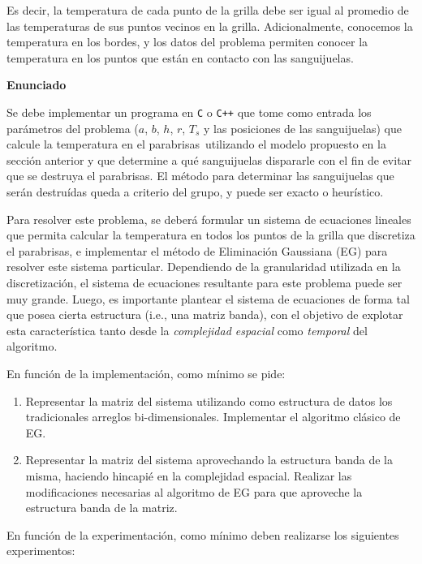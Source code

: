 \documentclass[double, 1.5in, 12pt]{beavtex}
\newcommand{\atacante}{sanguijuela}
\newcommand{\objeto}{parabrisas}
\begin{document}
Es decir, la temperatura de cada punto de la grilla debe ser igual al promedio de las tem\-pe\-ra\-tu\-ras de sus puntos vecinos en la grilla. Adicionalmente, conocemos la temperatura en los bordes, y los datos del problema permiten conocer la temperatura en los puntos que est\'an en contacto con las \atacante s.

{\noindent \bf Enunciado}

Se debe implementar un programa en \verb+C+ o \verb-C++- que tome como entrada los par\'ametros del problema ($a$, $b$, $h$, $r$, $T_s$ y las posiciones de las \atacante s) que calcule la temperatura en el \objeto\ utilizando el modelo propuesto en la secci\'on anterior y que determine a qu\'e \atacante s dispararle con el fin de evitar que se destruya el \objeto. El m\'etodo para determinar las \atacante s que ser\'an destru\'idas queda a criterio del grupo, y puede ser exacto o heur\'istico.

Para resolver este problema, se deber\'a formular un sistema de ecuaciones lineales que permita calcular la temperatura en todos los puntos de la grilla que discretiza el \objeto, e implementar el m\'etodo de Eliminaci\'on Gaussiana (EG) para resolver este sistema particular. Dependiendo de la granularidad utilizada en la discretizaci\'on, el sistema de ecuaciones resultante para este problema puede ser muy grande. Luego, es importante plantear el sistema de ecuaciones de forma tal que posea cierta estructura (i.e., una matriz banda), con el objetivo de explotar esta caracter\'istica tanto desde la \emph{complejidad espacial} como \emph{temporal} del algoritmo.

En funci\'on de la implementaci\'on, como m\'inimo se pide:
\begin{enumerate}
\item Representar la matriz del sistema utilizando como estructura de datos los tradicionales arreglos bi-dimensionales. Implementar el algoritmo cl\'asico de EG. \label{enum:EGcomun}
\item Representar la matriz del sistema aprovechando la estructura banda de la misma, haciendo hincapi\'e en la complejidad espacial.  Realizar las modificaciones necesarias al algoritmo de EG para que aproveche la estructura banda de la matriz. \label{enum:EGbanda}
\end{enumerate}

En funci\'on de la experimentaci\'on, como m\'inimo deben realizarse los siguientes experimentos:
\end{document}
